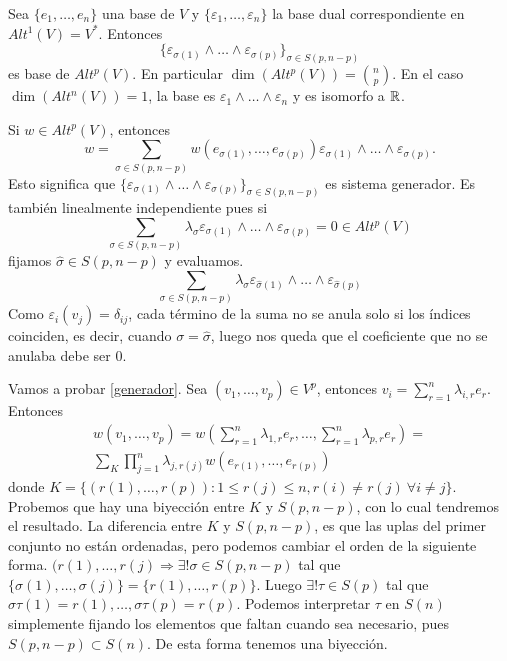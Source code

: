 \documentclass[CV.tex]{subfiles}
\begin{document}
\begin{teorema}
Sea $\{e_1,\dots, e_n\}$ una base de $V$ y $\{\varepsilon_1,\dots, \varepsilon_n\}$ la base dual correspondiente en $Alt^1(V)=V^*$. Entonces 
$$\{\varepsilon_{\sigma(1)}\land\dots\land\varepsilon_{\sigma(p)}\}_{\sigma\in S(p,n-p)}$$
es base de $Alt^p(V)$. En particular $\dim(Alt^p(V))=\binom{n}{p}$. En el caso $\dim(Alt^n(V))=1$, la base es $\varepsilon_1\land\dots\land\varepsilon_n$ y es isomorfo a $\mathbb{R}$.
\end{teorema}
\begin{dem}
Si $w\in Alt^p(V)$, entonces
\begin{equation}\label{generador}
w=\sum_{\sigma\in S(p,n-p)}w(e_{\sigma(1)},\dots,e_{\sigma(p)})\varepsilon_{\sigma(1)}\land\dots\land\varepsilon_{\sigma(p)}.
\end{equation}
Esto significa que $\{\varepsilon_{\sigma(1)}\land\dots\land\varepsilon_{\sigma(p)}\}_{\sigma\in S(p,n-p)}$ es sistema generador. Es también linealmente independiente pues si
$$\sum_{\sigma\in S(p,n-p)}\lambda_{\sigma}\varepsilon_{\sigma(1)}\land\dots\land\varepsilon_{\sigma(p)}=0\in Alt^p(V)$$
fijamos $\hat{\sigma}\in S(p,n-p)$ y evaluamos.
$$\sum_{\sigma\in S(p,n-p)}\lambda_{\sigma}\varepsilon_{\hat{\sigma}(1)}\land\dots\land\varepsilon_{\hat{\sigma}(p)}$$
 Como $\varepsilon_i(v_j)=\delta_{ij}$, cada término de la suma no se anula solo si los índices coinciden, es decir, cuando $\sigma=\hat{\sigma}$, luego nos queda que el coeficiente que no se anulaba debe ser 0.
 
Vamos a probar \ref{generador}. Sea $(v_1,\dots, v_p)\in V^p$, entonces $v_i=\sum_{r=1}^n\lambda_{i,r}e_r$. Entonces
\begin{gather*}
w(v_1,\dots, v_p)=w(\sum_{r=1}^n\lambda_{1,r}e_r,\dots, \sum_{r=1}^n\lambda_{p,r}e_r)=\\
\sum_K\prod_{j=1}^n\lambda_{j,r(j)}w(e_{r(1)},\dots, e_{r(p)})
\end{gather*}
donde $K=\{(r(1),\dots, r(p)):1\leq r(j)\leq n, r(i)\neq r(j)\ \forall i\neq j\}$. Probemos que hay una biyección entre $K$ y $S(p,n-p)$, con lo cual tendremos el resultado. La diferencia entre $K$ y $S(p,n-p)$, es que las uplas del primer conjunto no están ordenadas, pero podemos cambiar el orden de la siguiente forma. $(r(1),\dots, r(j)\Rightarrow\exists!\sigma\in S(p,n-p)$ tal que $\{\sigma(1),\dots, \sigma(j)\}=\{r(1),\dots, r(p)\}$. Luego $\exists!\tau\in S(p)$ tal que $\sigma\tau(1)=r(1),\dots, \sigma\tau(p)=r(p)$. Podemos interpretar $\tau$ en $S(n)$ simplemente fijando los elementos que faltan cuando sea necesario, pues $S(p,n-p)\subset S(n)$. De esta forma tenemos una biyección. 


\end{dem}
\end{document}

